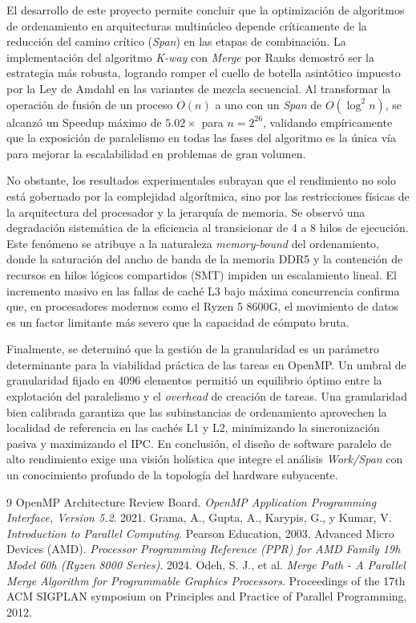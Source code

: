 \documentclass[12pt, a4paper]{article}
\begin{document}
El desarrollo de este proyecto permite concluir que la optimización de algoritmos de ordenamiento en arquitecturas multinúcleo depende críticamente de la reducción del camino crítico (\textit{Span}) en las etapas de combinación. La implementación del algoritmo \textit{K-way} con \textit{Merge} por Ranks demostró ser la estrategia más robusta, logrando romper el cuello de botella asintótico impuesto por la Ley de Amdahl en las variantes de mezcla secuencial. Al transformar la operación de fusión de un proceso $O(n)$ a uno con un \textit{Span} de $O(\log^2 n)$, se alcanzó un Speedup máximo de $5.02\times$ para $n=2^{26}$, validando empíricamente que la exposición de paralelismo en todas las fases del algoritmo es la única vía para mejorar la escalabilidad en problemas de gran volumen.

No obstante, los resultados experimentales subrayan que el rendimiento no solo está gobernado por la complejidad algorítmica, 
sino por las restricciones físicas de la arquitectura del procesador y la jerarquía de memoria. Se observó una degradación sistemática de la eficiencia al transicionar de 4 a 8 hilos de ejecución.
Este fenómeno se atribuye a la naturaleza \textit{memory-bound} del ordenamiento, donde la saturación del ancho de banda de la memoria DDR5 y la contención de recursos en hilos lógicos compartidos (SMT) impiden un escalamiento lineal. 
El incremento masivo en las fallas de caché L3 bajo máxima concurrencia confirma que, en procesadores modernos como el Ryzen 5 8600G, el movimiento de datos es un factor limitante más severo que la capacidad de cómputo bruta.

Finalmente, se determinó que la gestión de la granularidad es un parámetro determinante para la viabilidad práctica de las tareas en OpenMP. 
Un umbral de granularidad fijado en 4096 elementos permitió un equilibrio óptimo entre la explotación del paralelismo y el \textit{overhead} de creación de tareas. 
Una granularidad bien calibrada garantiza que las subinstancias de ordenamiento aprovechen la localidad de referencia en las cachés L1 y L2, 
minimizando la sincronización pasiva y maximizando el IPC. En conclusión, el diseño de software 
paralelo de alto rendimiento exige una visión holística que integre el análisis \textit{Work/Span} con un conocimiento profundo de la topología del hardware subyacente.



\begin{thebibliography}{9}
OpenMP Architecture Review Board. \textit{OpenMP Application Programming Interface, Version 5.2}. 2021.
Grama, A., Gupta, A., Karypis, G., y Kumar, V. \textit{Introduction to Parallel Computing}. Pearson Education, 2003.
Advanced Micro Devices (AMD). \textit{Processor Programming Reference (PPR) for AMD Family 19h Model 60h (Ryzen 8000 Series)}. 2024.
Odeh, S. J., et al. \textit{Merge Path - A Parallel Merge Algorithm for Programmable Graphics Processors}. Proceedings of the 17th ACM SIGPLAN symposium on Principles and Practice of Parallel Programming, 2012.
\end{thebibliography}
\end{document}
